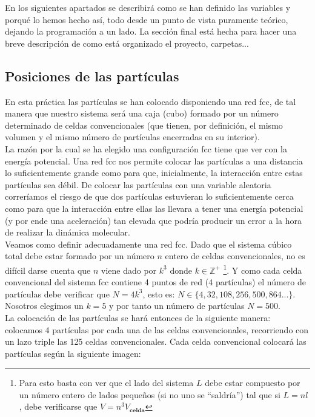 \documentclass[11pt]{article}
\begin{document}
En los siguientes apartados se describirá como se han definido las variables y porqué lo hemos hecho así, todo desde un punto de vista puramente teórico, dejando la programación a un lado. La sección final está hecha para hacer una breve descripción de como está organizado el proyecto, carpetas...


\subsection{Posiciones de las partículas}

En esta práctica las partículas se han colocado disponiendo una red fcc, de tal manera que nuestro sistema será una caja (cubo) formado por un número determinado de celdas convencionales (que tienen, por definición, el mismo volumen y el mismo número de partículas encerradas en su interior). \\

La razón por la cual se ha elegido una configuración fcc tiene que ver con la energía potencial. Una red fcc nos permite colocar las partículas a una distancia lo suficientemente grande como para que, inicialmente, la interacción entre estas partículas sea débil. De colocar las partículas con una variable aleatoria correríamos el riesgo de que dos partículas estuvieran lo suficientemente cerca como para que la interacción entre ellas las llevara a tener una energía potencial (y por ende una aceleración) tan elevada que podría producir un error a la hora de realizar la dinámica molecular. \\

Veamos como definir adecuadamente una red fcc. Dado que el sistema cúbico total debe estar formado por un número $n$ entero de celdas convencionales, no es difícil darse cuenta que $n$ viene dado por $k^3$ donde $k\in\mathbb{Z^+}$ \footnote{Para esto basta con ver que el lado del sistema $L$ debe estar compuesto por un número entero de lados pequeños (si no uno se ``saldría'') tal que si $L=nl$, debe verificarse que $V=n^3V_{\textbf{celda}}$}. Y como cada celda convencional del sistema fcc contiene 4 puntos de red (4 partículas) el número de partículas debe verificar que $N=4k^3$, esto es: $N\in\{4,32,108,256,500,864...\}$. Nosotros elegimos un $k=5$ y por tanto un número de partículas $N=500$. \\

La colocación de las partículas se hará entonces de la siguiente manera: colocamos 4 partículas por cada una de las celdas convencionales, recorriendo con un lazo triple las 125 celdas convencionales. Cada celda convencional colocará las partículas según la siguiente imagen:
\end{document}
